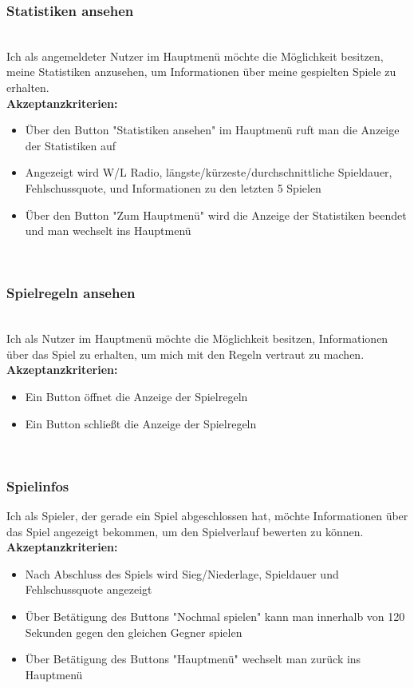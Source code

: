\documentclass[conference]{IEEEtran}
\begin{document}
    \subsubsection{Statistiken ansehen}
    \ \\
    Ich als angemeldeter Nutzer im Hauptmenü möchte die Möglichkeit besitzen, meine Statistiken anzusehen, um Informationen über meine gespielten Spiele zu erhalten. \\
    \textbf{Akzeptanzkriterien:}
    \begin{itemize}
        \item Über den Button "Statistiken ansehen" im Hauptmenü ruft man die Anzeige der Statistiken auf
        \item Angezeigt wird W/L Radio, längste/kürzeste/durchschnittliche Spieldauer, Fehlschussquote, und Informationen zu den letzten 5 Spielen
        \item Über den Button "Zum Hauptmenü" wird die Anzeige der Statistiken beendet und man wechselt ins Hauptmenü
    \end{itemize}
    \ \\
    \subsubsection{Spielregeln ansehen}
    \ \\
    Ich als Nutzer im Hauptmenü möchte die Möglichkeit besitzen, Informationen über das Spiel zu erhalten, um mich mit den Regeln vertraut zu machen. \\
     \textbf{Akzeptanzkriterien:}
    \begin{itemize}
        \item Ein Button öffnet die Anzeige der Spielregeln
        \item Ein Button schließt die Anzeige der Spielregeln
    \end{itemize}
    \ \\
    \subsubsection{Spielinfos}
    Ich als Spieler, der gerade ein Spiel abgeschlossen hat, möchte Informationen über das Spiel angezeigt bekommen, um den Spielverlauf bewerten zu können. \\
    \textbf{Akzeptanzkriterien:}
    \begin{itemize}
        \item Nach Abschluss des Spiels wird Sieg/Niederlage, Spieldauer und Fehlschussquote angezeigt
        \item Über Betätigung des Buttons "Nochmal spielen" kann man innerhalb von 120 Sekunden gegen den gleichen Gegner spielen
        \item Über Betätigung des Buttons "Hauptmenü" wechselt man zurück ins Hauptmenü
    \end{itemize}
    \ \\
\end{document}
